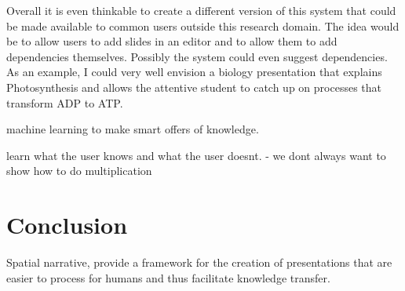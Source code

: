 \documentclass[twoside, 12pt]{article}
\newcommand{\sys}{\textsc{RPresentation}\xspace}
\begin{document}
Overall it is even thinkable to create a different version of this system that could be made available to common users outside this research domain. The idea would be to allow users to add slides in an editor and to allow them to add dependencies themselves. Possibly the system could even suggest dependencies. As an example, I could very well envision a biology presentation that explains Photosynthesis and allows the attentive student to catch up on processes that transform ADP to ATP.\\


machine learning to make smart offers of knowledge. 

learn what the user knows and what the user doesnt. - we dont always want to show how to do multiplication

\section{Conclusion}
\label{sec:conclusion}
Spatial narrative, provide a framework for the creation of presentations that are easier to process for humans and thus facilitate knowledge transfer.\\


\end{document}
